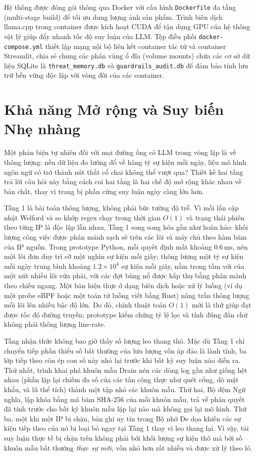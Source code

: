 Hệ thống được đóng gói thông qua Docker với cấu hình \texttt{Dockerfile} đa tầng (multi-stage build) để tối ưu dung lượng ảnh sản phẩm. Trình biên dịch llama.cpp trong container được kích hoạt CUDA để tận dụng GPU của hệ thống vật lý giúp đẩy nhanh tốc độ suy luận của LLM. Tệp điều phối \texttt{docker-compose.yml} thiết lập mạng nội bộ liên kết container tác tử và container Streamlit, chia sẻ chung các phân vùng ổ đĩa (volume mounts) chứa các cơ sở dữ liệu SQLite là \texttt{threat\_memory.db} và \texttt{guardrails\_audit.db} để đảm bảo tính lưu trữ bền vững độc lập với vòng đời của các container.

\section{Khả năng Mở rộng và Suy biến Nhẹ nhàng}

Một phản biện tự nhiên đối với mọi đường ống có LLM trong vòng lặp là về thông lượng: nếu dữ liệu đo lường đổ về hàng tỷ sự kiện mỗi ngày, liệu mô hình ngôn ngữ có trở thành nút thắt cổ chai không thể vượt qua? Thiết kế hai tầng trả lời câu hỏi này bằng cách coi hai tầng là hai chế độ mở rộng khác nhau về bản chất, thay vì trang bị phần cứng suy luận ngày càng lớn hơn.

Tầng 1 là bài toán thông lượng, không phải bức tường độ trễ. Vì mỗi lần cập nhật Welford và so khớp regex chạy trong thời gian $O(1)$ và trạng thái phiên theo từng IP là độc lập lẫn nhau, Tầng 1 song song hóa gần như hoàn hảo: khối lượng công việc được phân mảnh sạch sẽ trên các lõi và máy chủ theo hàm băm của IP nguồn. Trong prototype Python, mỗi quyết định mất khoảng $0.6$\,ms, nên một lõi đơn duy trì cỡ một nghìn sự kiện mỗi giây; thông lượng một tỷ sự kiện mỗi ngày trung bình khoảng $1.2\times10^{4}$ sự kiện mỗi giây, nằm trong tầm với của một nút nhiều lõi vừa phải, với các đợt bùng nổ được hấp thụ bằng phân mảnh theo chiều ngang. Một bản hiện thực ở dạng biên dịch hoặc xử lý luồng (ví dụ một probe eBPF hoặc một toán tử luồng viết bằng Rust) nâng trần thông lượng mỗi lõi lên nhiều bậc độ lớn. Do đó, chính thuật toán $O(1)$ mới là thứ giúp đạt được tốc độ đường truyền; prototype kiểm chứng tỷ lệ lọc và tính đúng đắn chứ không phải thông lượng line-rate.

Tầng nhận thức không bao giờ thấy số lượng leo thang thô. Mặc dù Tầng 1 chỉ chuyển tiếp phần thiểu số bất thường của lưu lượng vốn áp đảo là lành tính, ba lớp tiếp theo còn ép con số này nhỏ lại trước khi bất kỳ suy luận nào diễn ra. Thứ nhất, trình khai phá khuôn mẫu Drain nén các dòng log gần như giống hệt nhau (phần lặp lại chiếm đa số của các tấn công thực như quét cổng, dò mật khẩu, và lũ thể tích) thành một tập nhỏ các khuôn mẫu. Thứ hai, Bộ đệm Ngữ nghĩa, lập khóa bằng mã băm SHA-256 của mỗi khuôn mẫu, trả về phán quyết đã tính trước cho bất kỳ khuôn mẫu lặp lại nào mà không gọi lại mô hình. Thứ ba, một khi một IP bị chặn, bản ghi uy tín trong Bộ nhớ Đe dọa khiến các sự kiện tiếp theo của nó bị loại bỏ ngay tại Tầng 1 thay vì leo thang lại. Vì vậy, tải suy luận thực tế bị chặn trên không phải bởi khối lượng sự kiện thô mà bởi số khuôn mẫu bất thường \emph{thực sự mới}, vốn nhỏ hơn rất nhiều và được xử lý theo lô.

